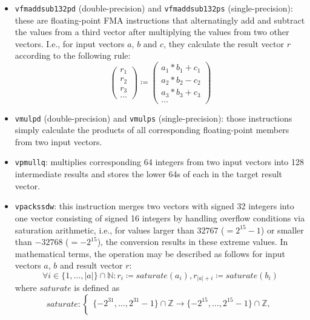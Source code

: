 \begin{itemize}
	\item \texttt{vfmaddsub132pd} (double-precision) and \texttt{vfmaddsub132ps} (single-precision): these are floating-point \gls{FMA} instructions that alternatingly add and subtract the values from a third vector after multiplying the values from two other vectors. I.e., for input vectors $a$, $b$ and $c$, they calculate the result vector $r$ according to the following rule:
	\begin{displaymath}
		\begin{pmatrix}
		r_1 \\
		r_2 \\
		r_3 \\
		\dots
		\end{pmatrix}
		\coloneqq
		\begin{pmatrix}
		a_1 * b_1 + c_1 \\
		a_2 * b_2 - c_2 \\
		a_3 * b_3 + c_3 \\
		\dots
		\end{pmatrix}
	\end{displaymath}
	\item \texttt{vmulpd} (double-precision) and \texttt{vmulps} (single-precision): those instructions simply calculate the products of all corresponding floating-point members from two input vectors.
	\item \texttt{vpmullq}: multiplies corresponding \SI{64}{\bit} integers from two input vectors into \SI{128}{\bit} intermediate results and stores the lower \SI{64}{\bit}s of each in the target result vector.
	\item \texttt{vpackssdw}: this instruction merges two vectors with signed \SI{32}{\bit} integers into one vector consisting of signed \SI{16}{\bit} integers by handling overflow conditions via saturation arithmetic, i.e., for values larger than $32767$ ($=2^{15}-1$) or smaller than $-32768$ ($=-2^{15}$), the conversion results in these extreme values. In mathematical terms, the operation may be described as follows for input vectors $a$, $b$ and result vector $r$:
		\begin{displaymath}
		\forall i \in \{1,\dots,|a|\} \cap \mathbb{N}\colon r_i \coloneqq saturate(a_i), r_{|a|+i} \coloneqq saturate(b_i)
		\end{displaymath}
		where $saturate$ is defined as
		\begin{displaymath}
		saturate\colon
		\begin{cases}
			\{-2^{31}, \dots, 2^{31}-1\} \cap \mathbb{Z} \longrightarrow \{-2^{15}, \dots, 2^{15}-1\} \cap \mathbb{Z}, \\

\end{cases}
\end{displaymath}
\end{itemize}
